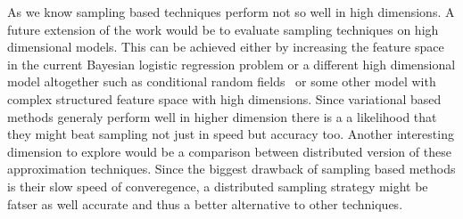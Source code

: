 As we know sampling based techniques perform not so well in high dimensions. A
future extension of the work would be to evaluate sampling techniques on high
dimensional models. This can be achieved either by increasing the feature space
in the current Bayesian logistic regression problem or a different high
dimensional model altogether such as conditional random
fields~\cite{sutton06introduction} or some
other model with complex structured feature space with high dimensions. Since
variational based methods generaly perform well in higher dimension there is a
a likelihood that they might beat sampling not just in speed but accuracy too. 
Another interesting dimension to explore would be a comparison between
distributed version of these approximation techniques. Since the biggest
drawback of sampling based methods is their slow speed of converegence, a
distributed sampling strategy might be fatser as well accurate and thus a better
alternative to other techniques. 

% 
% 

